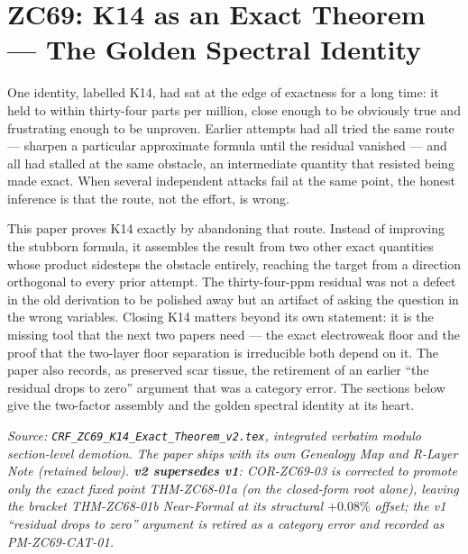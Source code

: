 \documentclass[12pt, a4paper]{article}
\begin{document}
\bigskip

\section{ZC69: K14 as an Exact Theorem --- The Golden Spectral Identity}

One identity, labelled K14, had sat at the edge of exactness for a long time:
it held to within thirty-four parts per million, close enough to be obviously
true and frustrating enough to be unproven. Earlier attempts had all tried the
same route --- sharpen a particular approximate formula until the residual
vanished --- and all had stalled at the same obstacle, an intermediate quantity
that resisted being made exact. When several independent attacks fail at the
same point, the honest inference is that the route, not the effort, is wrong.

This paper proves K14 exactly by abandoning that route. Instead of improving
the stubborn formula, it assembles the result from two other exact quantities
whose product sidesteps the obstacle entirely, reaching the target from a
direction orthogonal to every prior attempt. The thirty-four-ppm residual was
not a defect in the old derivation to be polished away but an artifact of
asking the question in the wrong variables. Closing K14 matters beyond its own
statement: it is the missing tool that the next two papers need --- the exact
electroweak floor and the proof that the two-layer floor separation is
irreducible both depend on it. The paper also records, as preserved scar
tissue, the retirement of an earlier ``the residual drops to zero'' argument
that was a category error. The sections below give the two-factor assembly and
the golden spectral identity at its heart.
\label{sec:zc69}

\noindent
\textit{Source: \texttt{CRF\_ZC69\_K14\_Exact\_Theorem\_v2.tex},
integrated verbatim modulo section-level demotion. The paper ships with its
own Genealogy Map and R-Layer Note (retained below).
\textbf{v2 supersedes v1}: COR-ZC69-03 is corrected to promote only the exact
fixed point THM-ZC68-01a (on the closed-form root alone), leaving the bracket
THM-ZC68-01b Near-Formal at its structural $+0.08\%$ offset; the v1 ``residual
drops to zero'' argument is retired as a category error and recorded as
PM-ZC69-CAT-01.}

\medskip
\end{document}
